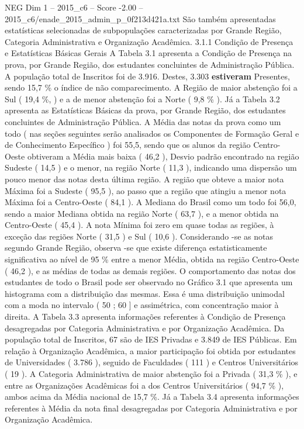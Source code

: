\begin{textsample}{NEG Dim 1 – 2015\_c6 – Score -2.00 – 2015\_c6/enade\_2015\_admin\_p\_0f213d421a.txt}
São também apresentadas estatísticas selecionadas de subpopulações caracterizadas por Grande Região, Categoria Administrativa e Organização Acadêmica. 3.1.1 Condição de Presença e Estatísticas Básicas Gerais A Tabela 3.1 apresenta a Condição de Presença na prova, por Grande Região, dos estudantes concluintes de Administração Pública.
A população total de Inscritos foi de 3.916.
Destes, 3.303 \textbf{estiveram} Presentes, sendo 15,7 \% o índice de não comparecimento.
A Região de maior abstenção foi a Sul ( 19,4 \%, ) e a de menor abstenção foi a Norte ( 9,8 \% ).
Já a Tabela 3.2 apresenta as Estatísticas Básicas da prova, por Grande Região, dos estudantes concluintes de Administração Pública.
A Média das notas da prova como um todo ( nas seções seguintes serão analisados os Componentes de Formação Geral e de Conhecimento Específico ) foi 55,5, sendo que os alunos da região Centro-Oeste obtiveram a Média mais baixa ( 46,2 ), Desvio padrão encontrado na região Sudeste ( 14,5 ) e o menor, na região Norte ( 11,3 ), indicando uma dispersão um pouco menor das notas desta última região.
A região que obteve a maior nota Máxima foi a Sudeste ( 95,5 ), ao passo que a região que atingiu a menor nota Máxima foi a Centro-Oeste ( 84,1 ).
A Mediana do Brasil como um todo foi 56,0, sendo a maior Mediana obtida na região Norte ( 63,7 ), e a menor obtida na Centro-Oeste ( 45,4 ).
A nota Mínima foi zero em quase todas as regiões, à exceção das regiões Norte ( 31,5 ) e Sul ( 10,6 ).
Considerando -se as notas segundo Grande Região, observa -se que existe diferença estatisticamente significativa ao nível de 95 \% entre a menor Média, obtida na região Centro-Oeste ( 46,2 ), e as médias de todas as demais regiões.
O comportamento das notas dos estudantes de todo o Brasil pode ser observado no Gráfico 3.1 que apresenta um histograma com a distribuição das mesmas.
Essa é uma distribuição unimodal com a moda no intervalo ( 50 ; 60 ] e assimétrica, com concentração maior à direita.
A Tabela 3.3 apresenta informações referentes à Condição de Presença desagregadas por Categoria Administrativa e por Organização Acadêmica.
Da população total de Inscritos, 67 são de IES Privadas e 3.849 de IES Públicas.
Em relação à Organização Acadêmica, a maior participação foi obtida por estudantes de Universidades ( 3.786 ), seguido de Faculdades ( 111 ) e Centros Universitários ( 19 ).
A Categoria Administrativa de maior abstenção foi a Privada ( 31,3 \% ), e entre as Organizações Acadêmicas foi a dos Centros Universitários ( 94,7 \% ), ambos acima da Média nacional de 15,7 \%.
Já a Tabela 3.4 apresenta informações referentes à Média da nota final desagregadas por Categoria Administrativa e por Organização Acadêmica.

\end{textsample}
